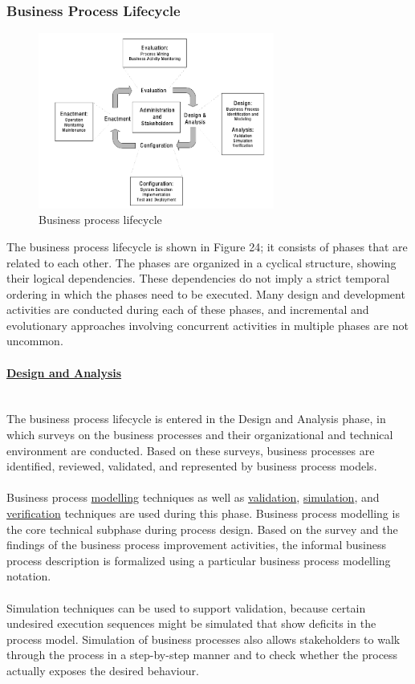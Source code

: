 \documentclass[10pt,a4paper]{article}
\newcommand{\myparagraph}[1]{\paragraph{\uline{#1}}\mbox{}\\[0.05in]}
\begin{document}
\subsubsection{Business Process Lifecycle}
\begin{figure}[ht!]
 \hfill \includegraphics[width=220pt]{images/business-process-lifecycle}\hspace*{\fill}
 \caption{Business process lifecycle}
  \label{fig:bpl}
\end{figure}
The business process lifecycle is shown in Figure 24; it consists of phases that are related to each other. The phases are organized in a cyclical structure, showing their logical dependencies. These dependencies do not imply a strict temporal ordering in which the phases need to be executed. Many design and development activities are conducted during each of these phases, and incremental and evolutionary approaches involving concurrent activities in multiple phases are not uncommon.
\myparagraph{Design and Analysis}
The business process lifecycle is entered in the Design and Analysis phase, in which surveys on the business processes and their organizational and technical environment are conducted. Based on these surveys, business processes are identified, reviewed, validated, and represented by business process models. \\ \\
Business process \uline{modelling} techniques as well as \uline{validation}, \uline{simulation}, and \uline{verification} techniques are used during this phase. Business process modelling is the core technical subphase during process design. Based on the survey and the findings of the business process improvement activities, the informal business process description is formalized using a particular business process modelling notation. \\ \\
Simulation techniques can be used to support validation, because certain undesired execution sequences might be simulated that show deficits in the process model. Simulation of business processes also allows stakeholders to walk through the process in a step-by-step manner and to check whether the process actually exposes the desired behaviour.
\end{document}

